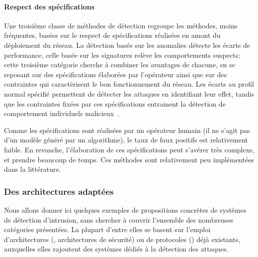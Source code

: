         \paragraph{Respect des spécifications}
Une troisième classe de méthodes de détection regroupe les méthodes, moins fréquentes, basées sur le respect de spécifications réalisées en amont du déploiement du réseau.
La détection basée sur les anomalies détecte les écarts de performance, celle basée sur les signatures relève les comportements suspects; cette troisième catégorie cherche à combiner les avantages de chacune, en se reposant sur des spécifications élaborées par l'opérateur ainsi que sur des contraintes qui caractérisent le bon fonctionnement du réseau.
Les écarts au profil normal spécifié permettent de détecter les attaques en identifiant leur effet, tandis que les contraintes fixées par ces spécifications entrainent la détection de comportement individuels malicieux~\cite{BMS13}.

Comme les spécifications sont réalisées par un opérateur humain (il ne s'agit pas d'un modèle généré par un algorithme), le taux de faux positifs est relativement faible.
En revanche, l'élaboration de ces spécifications peut s'avérer très complexe, et prendre beaucoup de temps.
Ces méthodes sont relativement peu implémentées dans la littérature.

    \subsubsection{Des architectures adaptées}
Nous allons donner ici quelques exemples de propositions concrètes de systèmes de détection d'intrusion, sans chercher à couvrir l'ensemble des nombreuses catégories présentées.
La plupart d'entre elles se basent sur l'emploi d'architectures (, architectures de sécurité) ou de protocoles () déjà existants, auxquelles elles rajoutent des systèmes dédiés à la détection des attaques.

